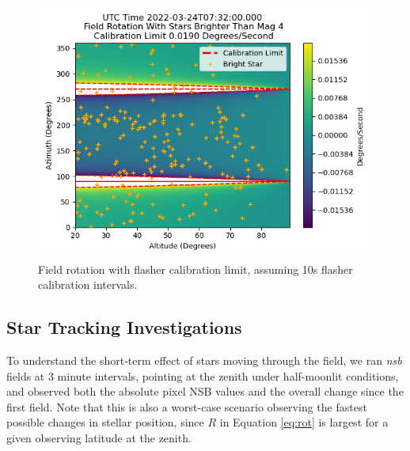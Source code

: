 \begin{figure}[t!]
\begin{centering}
\includegraphics[width=0.7\columnwidth]{./figures/rot10s.png}
\caption{Field rotation with flasher calibration limit, assuming 10s flasher calibration intervals.}
\label{fig:rot10s}
\end{centering}
\end{figure}

\subsection{Star Tracking Investigations}

To understand the short-term effect of stars moving through the field, we ran \textit{nsb} fields at 3 minute intervals, pointing at the zenith under half-moonlit conditions, and observed both the absolute pixel NSB values and the overall change since the first field. Note that this is also a worst-case scenario observing the fastest possible changes in stellar position, since $R$ in Equation \ref{eq:rot} is largest for a given observing latitude at the zenith.


